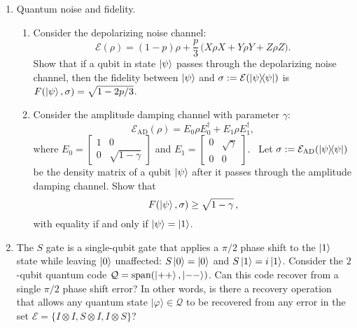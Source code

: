 \documentclass[11pt,a4paper]{article}
\def\cE{\mathcal{E}}
\begin{document}
\begin{enumerate}
\item Quantum noise and fidelity.
\begin{enumerate}
\item Consider the depolarizing noise channel:
$$\mathcal{E}(\rho) = (1-p) \rho + \frac{p}{3} \, \bigl(X \rho X + Y \rho Y + Z \rho Z\bigr).$$ 
Show that if a qubit in state $\ket\psi$ passes through the depolarizing noise channel, then the fidelity between $\ket\psi$ and $\sigma := \mathcal{E}(\ket\psi\!\!\bra\psi)$ is $F(\ket\psi,\sigma) = \sqrt{1-2p/3}$.
\item Consider the amplitude damping channel with parameter $\gamma$:
$$
\cE_{\text{AD}}(\rho) = E_0 \rho E_0^{\dag} + E_1 \rho E_1^\dag,
$$
where $E_0 = \begin{bmatrix} 1 & 0 \\ 0 & \sqrt{1-\gamma} \end{bmatrix}$ and $E_1 = \begin{bmatrix} 0 & \sqrt\gamma \\ 0 & 0 \end{bmatrix}$. \ Let $\sigma :=  \cE_{\text{AD}} (\ket\psi\!\!\bra\psi)$ be the density matrix of a qubit $\ket\psi$ after it passes through the amplitude damping channel. Show that 
$$
F(\ket\psi,\sigma) \ge \sqrt{1-\gamma} \, ,
$$
with equality if and only if $\ket\psi = \ket{1}$.
\end{enumerate}

\item The $S$ gate is a single-qubit gate that applies a $\pi/2$ phase shift to the $\ket{1}$ state while leaving $\ket{0}$ unaffected: $S\ket{0} = \ket{0}$ and $S\ket{1} = i\ket{1}$. Consider the $2$-qubit quantum code $\mathcal{Q} = \text{span}(\ket{++}, \ket{--})$. Can this code recover from a single $\pi/2$ phase shift error? In other words, is there a recovery operation that allows any quantum state $|\varphi\rangle \in \mathcal{Q}$ to be recovered from any error in the set $\mathcal{E} = \{I \otimes I,S \otimes I, I \otimes S\}$? 

\end{enumerate}
\end{document}
